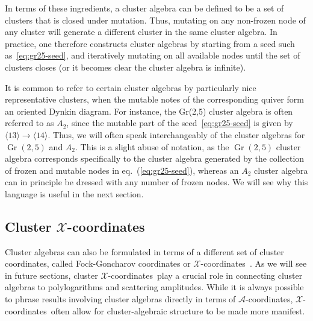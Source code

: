 \documentclass[12pt]{article}
\DeclareMathOperator{\Gr}{Gr}
\def\ket#1{\langle #1 \rangle}
\def\x{\mathcal{X}}
\def\xcoords{$\mathcal{X}$-coordinates}
\def\acoords{$\mathcal{A}$-coordinates}
\begin{document}
In terms of these ingredients, a cluster algebra can be defined to be a set of clusters that is closed under mutation. Thus, mutating on any non-frozen node of any cluster will generate a different cluster in the same cluster algebra. In practice, one therefore constructs cluster algebras by starting from a seed such as~\eqref{eq:gr25-seed}, and iteratively mutating on all available nodes until the set of clusters closes (or it becomes clear the cluster algebra is infinite). 

It is common to refer to certain cluster algebras by particularly nice representative clusters, when the mutable notes of the corresponding quiver form an oriented Dynkin diagram. For instance, the Gr(2,5) cluster algebra is often referred to as  $A_2$, since the mutable part of the seed~\eqref{eq:gr25-seed} is given by $\ket{13}\to\ket{14}$. Thus, we will often speak interchangeably of the cluster algebras for $\Gr(2,5)$ and $A_2$. This is a slight abuse of notation, as the $\Gr(2,5)$ cluster algebra corresponds specifically to the cluster algebra generated by the collection of frozen and mutable nodes in eq.~(\ref{eq:gr25-seed}), whereas an $A_2$ cluster algebra can in principle be dressed with any number of frozen nodes. We will see why this language is useful in the next section.

\subsection{Cluster \texorpdfstring{$\mathcal{X}$}{X}-coordinates}

Cluster algebras can also be formulated in terms of a different set of cluster coordinates, called Fock-Goncharov coordinates or $\x$-coordinates~\cite{FG03b}. As we will see in future sections, cluster \xcoords\ play a crucial role in connecting cluster algebras to polylogarithms and scattering amplitudes. While it is always possible to phrase results involving cluster algebras directly in terms of \acoords, \xcoords\ often allow for cluster-algebraic structure to be made more manifest. 
\end{document}

